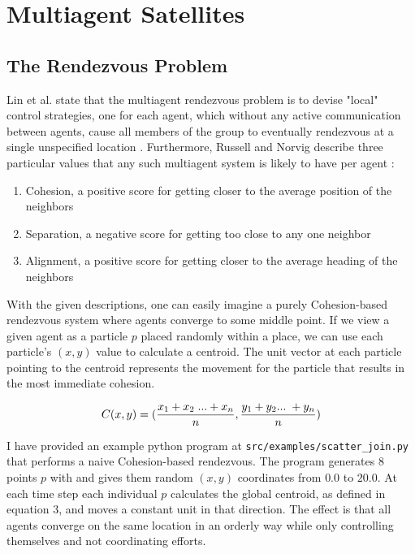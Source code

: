 \documentclass[journal,a4paper,12pt]{IEEEtran}
\begin{document}
%
%
\section{Multiagent Satellites}

\subsection{The Rendezvous Problem}
Lin et al. state that the multiagent rendezvous problem is to devise "local" control
strategies, one for each agent, which without any active communication between agents,
cause all members of the group to eventually rendezvous at a single unspecified location \cite{lin_multi}.
Furthermore, Russell and Norvig describe three particular values that any such multiagent
system is likely to have per agent \cite{class_book}:

\begin{enumerate}
  \item Cohesion, a positive score for getting closer to the average position of the neighbors
  \item Separation, a negative score for getting too close to any one neighbor
  \item Alignment, a positive score for getting closer to the average heading of the neighbors
\end{enumerate}

With the given descriptions, one can easily imagine a purely Cohesion-based rendezvous
system where agents converge to some middle point. If we view a given agent as a
particle $p$ placed randomly within a place, we can use each particle's $(x,y)$
value to calculate a centroid. The unit vector at each particle pointing to the
centroid represents the movement for the particle that results in the most immediate
cohesion.

\begin{equation}
  C(x,y) = (\frac{x_1 + x_2 \hspace{1mm} ... + x_n}{n} , \frac{y_1 + y_2 ... \hspace{1mm} + y_n}{n})
\end{equation}

I have provided an example python program at \texttt{src/examples/scatter\_join.py} that
performs a naive Cohesion-based rendezvous. The program generates 8 points $p$ with and
gives them random $(x,y)$ coordinates from $0.0$ to $20.0$. At each time step each
individual $p$ calculates the global centroid, as defined in equation 3, and
moves a constant unit in that direction. The effect is that all agents converge on
the same location in an orderly way while only controlling themselves and not coordinating
efforts.
\end{document}
